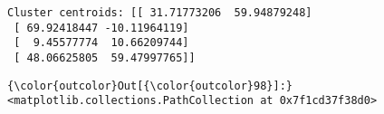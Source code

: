 \documentclass[11pt]{article}
\begin{document}
    \begin{Verbatim}[commandchars=\\\{\}]
Cluster centroids: [[ 31.71773206  59.94879248]
 [ 69.92418447 -10.11964119]
 [  9.45577774  10.66209744]
 [ 48.06625805  59.47997765]]

    \end{Verbatim}

\begin{Verbatim}[commandchars=\\\{\}]
{\color{outcolor}Out[{\color{outcolor}98}]:} <matplotlib.collections.PathCollection at 0x7f1cd37f38d0>
\end{Verbatim}
            
    \begin{center}
    \end{center}
    { \hspace*{\fill} \\}
    

    
    
    
    
\end{document}
